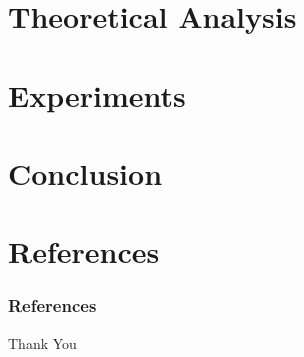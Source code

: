 \documentclass{beamer}
\begin{document}
\section{Theoretical Analysis}


\section{Experiments}


\section{Conclusion}


\section{References}
\begin{frame}[allowframebreaks]
\frametitle{References}
% 
 
%

\end{frame}



\begin{frame}
\Huge{\centerline{Thank You}}
\end{frame}

\end{document}
